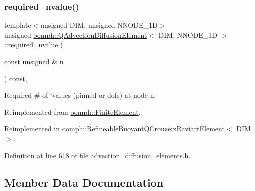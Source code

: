 \mbox{\label{classoomph_1_1QAdvectionDiffusionElement_a5add10bf35486c4ece4505a067cc2fd2}} 
\subsubsection{\texorpdfstring{required\+\_\+nvalue()}{required\_nvalue()}}
{\footnotesize\ttfamily template$<$unsigned D\+IM, unsigned N\+N\+O\+D\+E\+\_\+1D$>$ \\
unsigned \hyperlink{classoomph_1_1QAdvectionDiffusionElement}{oomph\+::\+Q\+Advection\+Diffusion\+Element}$<$ D\+IM, N\+N\+O\+D\+E\+\_\+1D $>$\+::required\+\_\+nvalue (\begin{DoxyParamCaption}\item[{const unsigned \&}]{n }\end{DoxyParamCaption}) const\hspace{0.3cm}{\ttfamily [inline]}, {\ttfamily [virtual]}}



Required \# of `values\textquotesingle{} (pinned or dofs) at node n. 



Reimplemented from \hyperlink{classoomph_1_1FiniteElement_a56610c60d5bc2d7c27407a1455471b1a}{oomph\+::\+Finite\+Element}.



Reimplemented in \hyperlink{classoomph_1_1RefineableBuoyantQCrouzeixRaviartElement_a664008af1b7a6444cee34bd4f506c318}{oomph\+::\+Refineable\+Buoyant\+Q\+Crouzeix\+Raviart\+Element$<$ D\+I\+M $>$}.



Definition at line 618 of file advection\+\_\+diffusion\+\_\+elements.\+h.



\subsection{Member Data Documentation}
\mbox{\label{classoomph_1_1QAdvectionDiffusionElement_a8befb76f93a0969e14d9a70a16668e8c}} 
